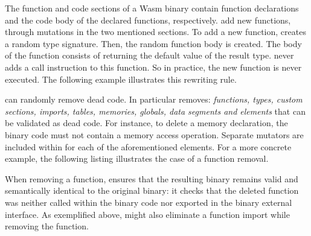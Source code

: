  The function and code sections of a Wasm binary contain function  declarations and the code body of the declared functions, respectively.
\tool add new functions, through mutations in the two mentioned sections.
To add a new function, \tool creates a random type signature.
Then, the random function body is created.
The body of the function consists of returning the default value of the result type.
\tool never adds a call instruction to this function.
So in practice, the new function is never executed.
The following example illustrates this rewriting rule.




 \tool can randomly remove dead code.
In particular \tool removes: \emph{functions, types, custom sections, imports, tables, memories, globals, data segments and elements} that can be validated as dead code.
For instance, to delete a memory declaration, the binary code must not contain a memory access operation. 
Separate mutators are included within \tool for each of the aforementioned elements.
For a more concrete example, the following listing illustrates the case of a function removal.



When removing a function, \tool ensures that the resulting binary remains valid and semantically identical to the original binary: it checks  that the deleted function was neither called within the binary code nor exported in the binary external interface. 
As exemplified above, \tool might also eliminate a function import while removing the function. 



